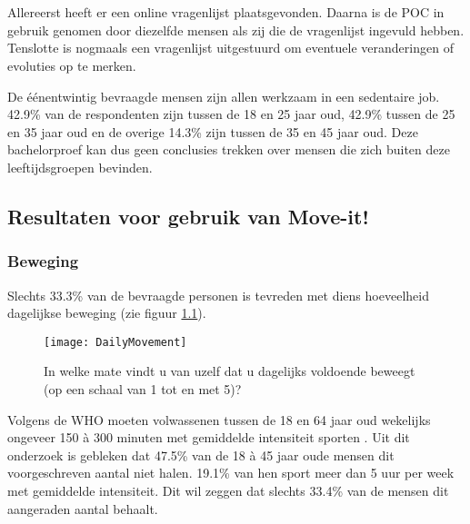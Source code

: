 \chapter{}%
\label{ch:analyse}

Allereerst heeft er een online vragenlijst plaatsgevonden. Daarna is de POC in gebruik genomen door diezelfde mensen als zij die de vragenlijst ingevuld hebben. Tenslotte is nogmaals een vragenlijst uitgestuurd om eventuele veranderingen of evoluties op te merken.

De éénentwintig bevraagde mensen zijn allen werkzaam in een sedentaire job. 42.9\% van de respondenten zijn tussen de 18 en 25 jaar oud, 42.9\% tussen de 25 en 35 jaar oud en de overige 14.3\% zijn tussen de 35 en 45 jaar oud. Deze bachelorproef kan dus geen conclusies trekken over mensen die zich buiten deze leeftijdsgroepen bevinden.

\section{Resultaten voor gebruik van Move-it!}

\subsection{Beweging}
Slechts 33.3\% van de bevraagde personen is tevreden met diens hoeveelheid dagelijkse beweging (zie figuur \ref{fig:dagelijkseBeweging}).

\begin{figure}[h]
    \caption[In welke mate vindt u van uzelf dat u dagelijks voldoende beweegt (op een schaal van 1 tot en met 5, gaande van 1 voor absoluut te weinig bewegen, tot en met 5 voor meer dan voldoende bewegen)?]{In welke mate vindt u van uzelf dat u dagelijks voldoende beweegt (op een schaal van 1 tot en met 5)?}
    \texttt{[image: DailyMovement]}
    \label{fig:dagelijkseBeweging}
\end{figure}

Volgens de WHO moeten volwassenen tussen de 18 en 64 jaar oud wekelijks ongeveer 150 à 300 minuten met gemiddelde intensiteit sporten \autocite{Bull2020}.
Uit dit onderzoek is gebleken dat 47.5\% van de 18 à 45 jaar oude mensen dit voorgeschreven aantal niet halen. 19.1\% van hen sport meer dan 5 uur per week met gemiddelde intensiteit. Dit wil zeggen dat slechts 33.4\% van de mensen dit aangeraden aantal behaalt.

